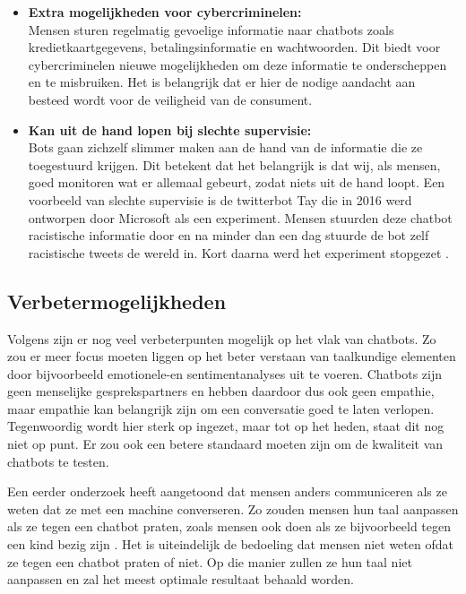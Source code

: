 \begin{itemize}
    \item \textbf{Extra mogelijkheden voor cybercriminelen:} \\
    
    Mensen sturen regelmatig gevoelige informatie naar chatbots zoals kredietkaartgegevens, betalingsinformatie en wachtwoorden. Dit biedt voor cybercriminelen nieuwe mogelijkheden om deze informatie te onderscheppen en te misbruiken. Het is belangrijk dat er hier de nodige aandacht aan besteed wordt voor de veiligheid van de consument. \\
    
    \item \textbf{Kan uit de hand lopen bij slechte supervisie:} \\
    
    Bots gaan zichzelf slimmer maken aan de hand van de informatie die ze toegestuurd krijgen. Dit betekent dat het belangrijk is dat wij, als mensen, goed monitoren wat er allemaal gebeurt, zodat niets uit de hand loopt. Een voorbeeld van slechte supervisie is de twitterbot Tay die in 2016 werd ontworpen door Microsoft als een experiment. Mensen stuurden deze chatbot racistische informatie door en na minder dan een dag stuurde de bot zelf racistische tweets de wereld in. Kort daarna werd het experiment stopgezet \autocite{Vincent2016}. \\
    
\end{itemize}

\subsection{Verbetermogelijkheden}
\label{subsec:verbetermogelijkheden}

Volgens \textcite{Hussain2019} zijn er nog veel verbeterpunten mogelijk op het vlak van chatbots. Zo zou er meer focus moeten liggen op het beter verstaan van taalkundige elementen door bijvoorbeeld emotionele-en sentimentanalyses uit te voeren. Chatbots zijn geen menselijke gesprekspartners en hebben daardoor dus ook geen empathie, maar empathie kan belangrijk zijn om een conversatie goed te laten verlopen. Tegenwoordig wordt hier sterk op ingezet, maar tot op het heden, staat dit nog niet op punt. Er zou ook een betere standaard moeten zijn om de kwaliteit van chatbots te testen.

Een eerder onderzoek heeft aangetoond dat mensen anders communiceren als ze weten dat ze met een machine converseren. Zo zouden mensen hun taal aanpassen als ze tegen een chatbot praten, zoals mensen ook doen als ze bijvoorbeeld tegen een kind bezig zijn \autocite{Hill2015}. Het is uiteindelijk de bedoeling dat mensen niet weten ofdat ze tegen een chatbot praten of niet. Op die manier zullen ze hun taal niet aanpassen en zal het meest optimale resultaat behaald worden. 

